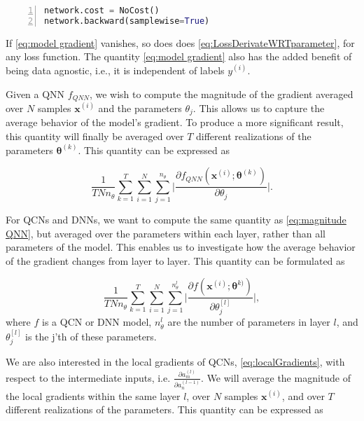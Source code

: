 \begin{lstlisting}[language=python, numbers=left]
network.cost = NoCost()
network.backward(samplewise=True)
\end{lstlisting}

If \autoref{eq:model gradient} vanishes, so does does \autoref{eq:LossDerivateWRTparameter}, for any loss function. The quantity \autoref{eq:model gradient} also has the added benefit of being data agnostic, i.e., it is independent of labels $y^{(i)}$.

Given a QNN $f_{QNN}$, we wish to compute the magnitude of the gradient averaged over $N$ samples $\boldsymbol{x}^{(i)}$ and the parameters $\theta_j$. This allows us to capture the average behavior of the model's gradient. To produce a more significant result, this quantity will finally be averaged over $T$ different realizations of the parameters $\boldsymbol{\theta}^{(k)}$. This quantity can be expressed as

\begin{equation}\label{eq:magnitude QNN}
    \frac{1}{TNn_{\theta}}\sum_{k=1}^T\sum_{i=1}^N \sum_{j=1}^{n_{\theta}}\big|\frac{\partial f_{QNN}(\boldsymbol{x}^{(i)};\boldsymbol{\theta}^{(k)})}{\partial \theta_j}\big|.
\end{equation}

For QCNs and DNNs, we want to compute the same quantity as \autoref{eq:magnitude QNN}, but averaged over the parameters within each layer, rather than all parameters of the model. This enables us to investigate how the average behavior of the gradient changes from layer to layer. This quantity can be formulated as

\begin{equation}\label{eq:magnitude QCN DNN}
    \frac{1}{TNn_{\theta}}\sum_{k=1}^T\sum_{i=1}^N \sum_{j=1}^{n_{\theta}^{l}}\big|\frac{\partial f(\boldsymbol{x}^{(i)};\boldsymbol{\theta}^{k)})}{\partial \theta^{[l]}_j}\big|,
\end{equation}
where $f$ is a QCN or DNN model, $n_{\theta}^{l}$ are the number of parameters in layer $l$, and $\theta^{[l]}_j$ is the j'th of these parameters.


We are also interested in the local gradients of QCNs, \autoref{eq:localGradients}, with respect to the intermediate inputs, i.e. $\frac{\partial a_{m}^{(l)}}{\partial a_{n}^{(l-1)}}$. We will average the magnitude of the local gradients within the same layer $l$, over $N$ samples $\boldsymbol{x}^{(i)}$, and over $T$ different realizations of the parameters. This quantity can be expressed as 


